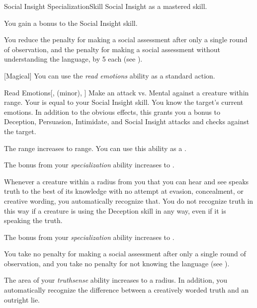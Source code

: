     \begin{feat}{Social Insight Specialization}{Skill}
        \featpre Social Insight as a mastered skill.

         You gain a  bonus to the Social Insight skill.

         You reduce the penalty for making a social assessment after only a single round of observation, and the penalty for making a social assessment without understanding the language, by 5 each (see ).

        [Magical] You can use the \textit{read emotions} ability as a standard action.
        \begin{freeability}{Read Emotions}[,  (minor), ]
            Make an attack vs. Mental against a creature within \rngshort range.
            Your  is equal to your Social Insight skill.
            \hit You know the target's current emotions.
            In addition to the obvious effects, this grants you a  bonus to Deception, Persuasion, Intimidate, and Social Insight attacks and checks against the target.

            \rankline
             The range increases to \rnglong range.
             You can use this ability as a .
        \end{freeability}

         The bonus from your \textit{specialization} ability increases to .

         Whenever a creature within a \arealarge radius  from you that you can hear and see speaks truth to the best of its knowledge with no attempt at evasion, concealment, or creative wording, you automatically recognize that.
        You do not recognize truth in this way if a creature is using the Deception skill in any way, even if it is speaking the truth.

         The bonus from your \textit{specialization} ability increases to .

         You take no penalty for making a social assessment after only a single round of observation, and you take no penalty for not knowing the language (see ).

         The area of your \textit{truthsense} ability increases to a \gargarea radius.
        In addition, you automatically recognize the difference between a creatively worded truth and an outright lie.
    \end{feat}


